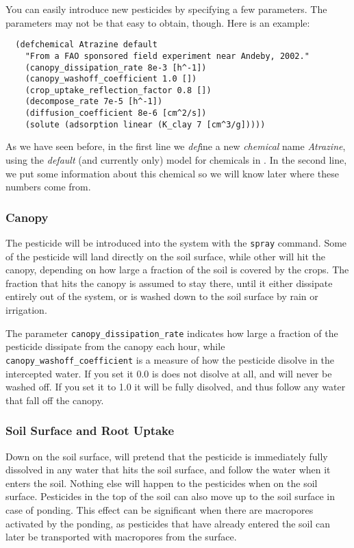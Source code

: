 \documentclass[a4paper,11pt]{article}
\begin{document}
You can easily introduce new pesticides by specifying a few
parameters.  The parameters may not be that easy to obtain, though.
Here is an example:
\begin{verbatim}
  (defchemical Atrazine default
    "From a FAO sponsored field experiment near Andeby, 2002."
    (canopy_dissipation_rate 8e-3 [h^-1])
    (canopy_washoff_coefficient 1.0 [])
    (crop_uptake_reflection_factor 0.8 [])
    (decompose_rate 7e-5 [h^-1])
    (diffusion_coefficient 8e-6 [cm^2/s])
    (solute (adsorption linear (K_clay 7 [cm^3/g]))))
\end{verbatim}
As we have seen before, in the first line we \emph{def}ine a new
\emph{chemical} name \emph{Atrazine}, using the \emph{default} (and
currently only) model for chemicals in \daisy{}.  In the second line,
we put some information about this chemical so we will know later
where these numbers come from.

\subsubsection{Canopy}

The pesticide will be introduced into the system with the
\texttt{spray} command.  Some of the pesticide will land directly on
the soil surface, while other will hit the canopy, depending on how
large a fraction of the soil is covered by the crops.  The fraction
that hits the canopy is assumed to stay there, until it either
dissipate entirely out of the system, or is washed down to the soil
surface by rain or irrigation.  

The parameter \texttt{canopy\_dissipation\_rate} indicates how large a
fraction of the pesticide dissipate from the canopy each hour, while
\linebreak{}\texttt{canopy\_washoff\_coefficient} is a measure of how
the pesticide disolve in the intercepted water.  If you set it 0.0 is
does not disolve at all, and will never be washed off.  If you set it
to 1.0 it will be fully disolved, and thus follow any water that fall
off the canopy.

\subsubsection{Soil Surface and Root Uptake}

Down on the soil surface, \daisy{} will pretend that the pesticide is
immediately fully dissolved in any water that hits the soil surface,
and follow the water when it enters the soil.  Nothing else will
happen to the pesticides when on the soil surface.  Pesticides in the
top of the soil can also move up to the soil surface in case of
ponding.  This effect can be significant when there are macropores
activated by the ponding, as pesticides that have already entered the
soil can later be transported with macropores from the surface.
\end{document}
